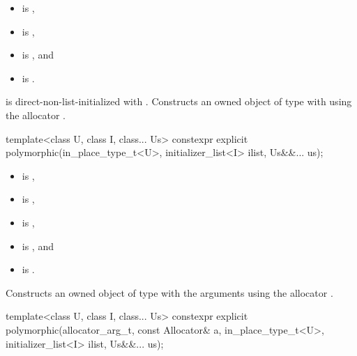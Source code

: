 \begin{itemdescr}
\pnum
\constraints
\begin{itemize}
\item
{} is ,
\item
{} is ,
\item
{} is , and
\item
{} is .
\end{itemize}

\pnum
\effects
{} is direct-non-list-initialized with .
Constructs an owned object of type  with
using the allocator .
\end{itemdescr}

%
\begin{itemdecl}
template<class U, class I, class... Us>
  constexpr explicit polymorphic(in_place_type_t<U>, initializer_list<I> ilist, Us&&... us);
\end{itemdecl}

\begin{itemdescr}
\pnum
\constraints
\begin{itemize}
\item
{} is ,
\item
{} is ,
\item
{} is ,
\item
{} is , and
\item
{} is .
\end{itemize}

\pnum
\effects
Constructs an owned object of type  with
the arguments 
using the allocator .
\end{itemdescr}

%
\begin{itemdecl}
template<class U, class I, class... Us>
  constexpr explicit polymorphic(allocator_arg_t, const Allocator& a,
                                 in_place_type_t<U>, initializer_list<I> ilist, Us&&... us);
\end{itemdecl}

